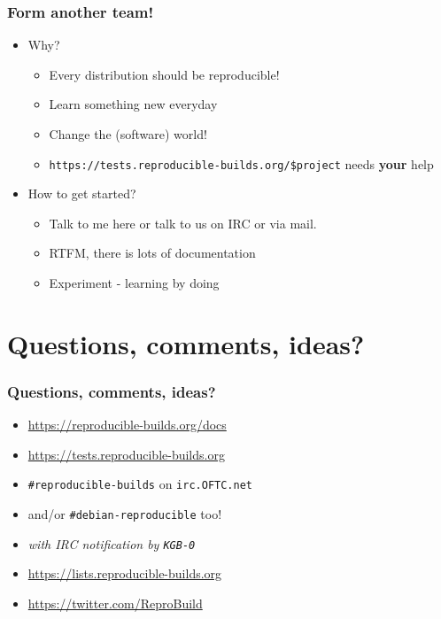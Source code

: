 \documentclass[14pt,aspectratio=169]{beamer}
\begin{document}
\begin{frame}
 \frametitle{Form another team!}

 \begin{itemize}
  \item Why?
   \begin{itemize}
    \item Every distribution should be reproducible!
    \item Learn something new everyday
    \item Change the (software) world!
    \item \texttt{https://tests.reproducible-builds.org/\$project} needs
    \textbf{your} help
   \end{itemize}
  \item How to get started?
   \begin{itemize}
    \item Talk to me here or talk to us on IRC or via mail.
    \item RTFM, there is lots of documentation
    \item Experiment - learning by doing
   \end{itemize}
 \end{itemize}
\end{frame}


\section{Questions, comments, ideas?}


\begin{frame}
 \frametitle{Questions, comments, ideas?}

 \begin{itemize}
  \item<2-3> \url{https://reproducible-builds.org/docs}
  \item<2-3> \url{https://tests.reproducible-builds.org}
  \item<2-3> \texttt{\#reproducible-builds} on \texttt{irc.OFTC.net}
  \item<2-3> \small{and/or \texttt{\#debian-reproducible} too!}
  \item<2-3> \small\it{with IRC notification by \texttt{KGB-0}}
  \item<3> \url{https://lists.reproducible-builds.org}
  \item<3> \url{https://twitter.com/ReproBuild}
  \end{itemize}
\end{frame}
\end{document}
